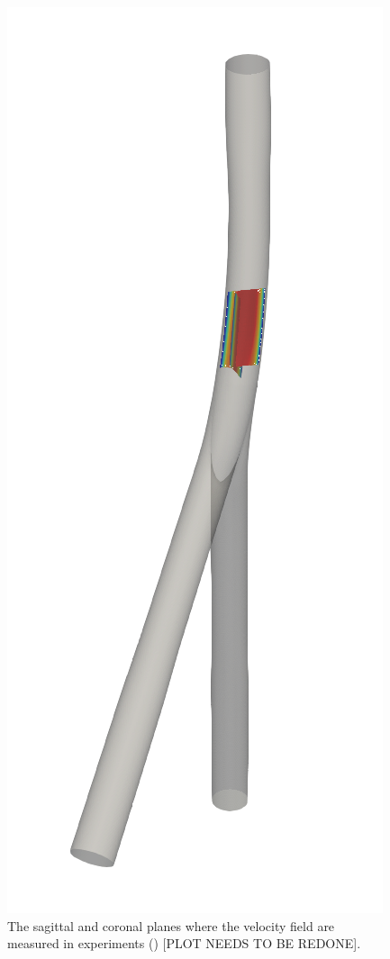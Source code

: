 \begin{figure}[htbp]
    \centering
    \includegraphics[scale=0.3]{imgs/vena_cava/PIV_plane_rest.png}
    \caption{The sagittal and coronal planes where the velocity field are measured in experiments (\cite{gallagher_exp}) [PLOT NEEDS TO BE REDONE].}
    \label{fig:IVCPIV}
\end{figure}

